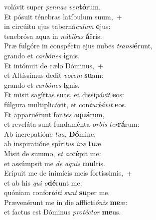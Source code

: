 \evenverse volávit super \textit{pen}\textit{nas} \textit{ven}\textbf{tó}rum.\\
\oddverse Et pósuit ténebras latíbulum suum,~+\\
\oddverse  in circúitu ejus taberná\textit{cu}\textit{lum} \textbf{e}jus:~\*\\
\oddverse tenebrósa aqua in \textit{nú}\textit{bi}\textit{bus} \textbf{á}ëris.\\
\evenverse Præ fulgóre in conspéctu ejus nubes \textit{tran}\textit{si}\textbf{é}runt,~\*\\
\evenverse grando et \textit{car}\textit{bó}\textit{nes} \textbf{i}gnis.\\
\oddverse Et intónuit de cælo Dóminus,~+\\
\oddverse  et Altíssimus dedit \textit{vo}\textit{cem} \textbf{su}am:~\*\\
\oddverse grando et \textit{car}\textit{bó}\textit{nes} \textbf{i}gnis.\\
\evenverse Et misit sagíttas suas, et dissi\textit{pá}\textit{vit} \textbf{e}os:~\*\\
\evenverse fúlgura multiplicávit, et con\textit{tur}\textit{bá}\textit{vit} \textbf{e}os.\\
\oddverse Et apparuérunt fon\textit{tes} \textit{a}\textbf{quá}rum,~\*\\
\oddverse et reveláta sunt fundaménta \textit{or}\textit{bis} \textit{ter}\textbf{rá}rum:\\
\evenverse Ab increpatióne \textit{tu}\textit{a}, \textbf{Dó}mine,~\*\\
\evenverse ab inspiratióne spíri\textit{tus} \textit{i}\textit{ræ} \textbf{tu}æ.\\
\oddverse Misit de summo, \textit{et} \textit{ac}\textbf{cé}pit me:~\*\\
\oddverse et assúmpsit me \textit{de} \textit{a}\textit{quis} \textbf{mul}tis.\\
\evenverse Erípuit me de inimícis meis fortíssimis,~+\\
\evenverse  et ab his \textit{qui} \textit{o}\textbf{dé}runt me:~\*\\
\evenverse quóniam confor\textit{tá}\textit{ti} \textit{sunt} \textbf{su}per me.\\
\oddverse Prævenérunt me in die afflicti\textit{ó}\textit{nis} \textbf{me}æ:~\*\\
\oddverse et factus est Dóminus \textit{pro}\textit{té}\textit{ctor} \textbf{me}us.\\
